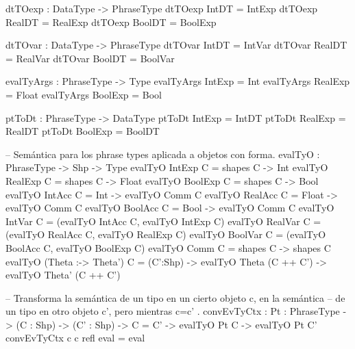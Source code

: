 \begin{code}
dtTOexp : DataType -> PhraseType
dtTOexp IntDT  = IntExp
dtTOexp RealDT = RealExp
dtTOexp BoolDT = BoolExp

dtTOvar : DataType -> PhraseType
dtTOvar IntDT  = IntVar
dtTOvar RealDT = RealVar
dtTOvar BoolDT = BoolVar

evalTyArgs : PhraseType -> Type
evalTyArgs IntExp  = Int
evalTyArgs RealExp = Float
evalTyArgs BoolExp = Bool

ptToDt : PhraseType -> DataType
ptToDt IntExp  = IntDT
ptToDt RealExp = RealDT
ptToDt BoolExp = BoolDT

-- Semántica para los phrase types aplicada a objetos con forma.
evalTyO : PhraseType -> Shp -> Type
evalTyO IntExp             C = shapes C -> Int
evalTyO RealExp            C = shapes C -> Float
evalTyO BoolExp            C = shapes C -> Bool
evalTyO IntAcc             C = Int -> evalTyO Comm C
evalTyO RealAcc            C = Float -> evalTyO Comm C
evalTyO BoolAcc            C = Bool -> evalTyO Comm C
evalTyO IntVar             C = (evalTyO IntAcc  C, evalTyO IntExp C)
evalTyO RealVar            C = (evalTyO RealAcc C, evalTyO RealExp C)
evalTyO BoolVar            C = (evalTyO BoolAcc C, evalTyO BoolExp C)
evalTyO Comm               C = shapes C -> shapes C
evalTyO (Theta :-> Theta') C = (C':Shp) -> 
                               evalTyO Theta (C ++ C') -> 
                               evalTyO Theta' (C ++ C')

-- Transforma la semántica de un tipo en un cierto objeto c, en la semántica
-- de un tipo en otro objeto c', pero mientras c=c' .
convEvTyCtx : {Pt : PhraseType} -> (C : Shp) -> (C' : Shp) -> C = C' -> 
              evalTyO Pt C -> evalTyO Pt C'
convEvTyCtx c c refl eval = eval


\end{code}
